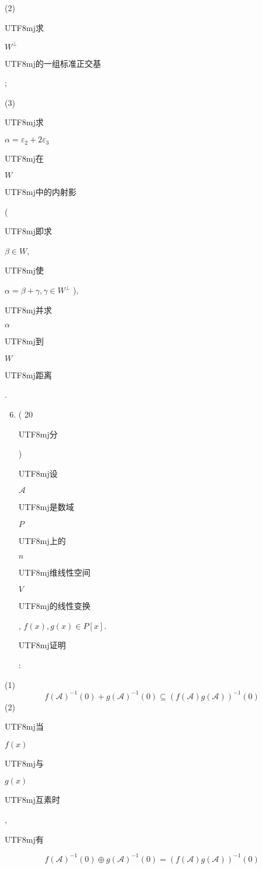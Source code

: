\documentclass[10pt]{article}
\begin{document}
(2) \begin{CJK}{UTF8}{mj}求\end{CJK} $W^{\perp}$ \begin{CJK}{UTF8}{mj}的一组标准正交基\end{CJK};

(3) \begin{CJK}{UTF8}{mj}求\end{CJK} $\alpha=\varepsilon_{2}+2 \varepsilon_{3}$ \begin{CJK}{UTF8}{mj}在\end{CJK} $W$ \begin{CJK}{UTF8}{mj}中的内射影\end{CJK} (\begin{CJK}{UTF8}{mj}即求\end{CJK} $\beta \in W$, \begin{CJK}{UTF8}{mj}使\end{CJK} $\alpha=\beta+\gamma, \gamma \in W^{\perp}$ ), \begin{CJK}{UTF8}{mj}并求\end{CJK} $\alpha$ \begin{CJK}{UTF8}{mj}到\end{CJK} $W$ \begin{CJK}{UTF8}{mj}距离\end{CJK}.

\begin{enumerate}
  \setcounter{enumi}{5}
  \item ( 20 \begin{CJK}{UTF8}{mj}分\end{CJK}) \begin{CJK}{UTF8}{mj}设\end{CJK} $\mathscr{A}$ \begin{CJK}{UTF8}{mj}是数域\end{CJK} $P$ \begin{CJK}{UTF8}{mj}上的\end{CJK} $n$ \begin{CJK}{UTF8}{mj}维线性空间\end{CJK} $V$ \begin{CJK}{UTF8}{mj}的线性变换\end{CJK}, $f(x), g(x) \in P[x]$. \begin{CJK}{UTF8}{mj}证明\end{CJK}:
\end{enumerate}
(1)
$$
f(\mathscr{A})^{-1}(0)+g(\mathscr{A})^{-1}(0) \subseteq(f(\mathscr{A}) g(\mathscr{A}))^{-1}(0)
$$
(2) \begin{CJK}{UTF8}{mj}当\end{CJK} $f(x)$ \begin{CJK}{UTF8}{mj}与\end{CJK} $g(x)$ \begin{CJK}{UTF8}{mj}互素时\end{CJK}, \begin{CJK}{UTF8}{mj}有\end{CJK}
$$
f(\mathscr{A})^{-1}(0) \oplus g(\mathscr{A})^{-1}(0)=(f(\mathscr{A}) g(\mathscr{A}))^{-1}(0)
$$
\end{document}
